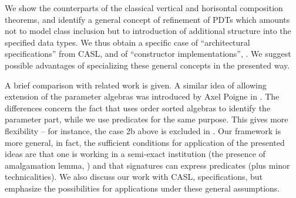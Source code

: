 \documentclass{llncs}
\begin{document}
We show the counterparts of the classical vertical and horisontal composition
theorems, \cite{Alge} and identify a general concept of refinement of PDTs which amounts
not to
model class inclusion but to introduction of additional structure into the
specified data types. We thus obtain a specific case of ``architectural
specifications'' from CASL, \cite{CASL} and of ``constructor implementations'', \cite{para,para1}.
We suggest possible advantages of specializing
these  general concepts in the presented way.

A brief comparison with related work is given. A similar idea of
allowing extension of the parameter algebras was
introduced by Axel Poigne in \cite{paramPoigne}. The differences
concern the fact that \cite{paramPoigne} uses order sorted
algebras to identify the parameter part, while we use predicates for the same purpose.
This gives more flexibility -- for instance,
the case 2b above is excluded in \cite{paramPoigne}.
Our framework is more general, in
fact, the
sufficient conditions for application of the presented ideas are that one
is working in a
semi-exact institution (the presence of amalgamation lemma, \cite{Alge}) and that
signatures can express predicates (plus minor technicalities).
We also discuss our work with CASL, \cite{CASL}
specifications, but emphasize the possibilities for applications under
these general assumptions.




%
\end{document}
